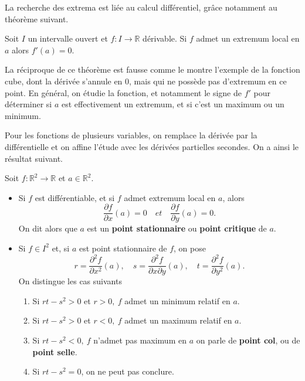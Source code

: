 		
		La recherche des extrema est liée au calcul différentiel, grâce notamment au théorème suivant.
		\begin{theorem}
			
			Soit $I$  un intervalle ouvert et $f:  I\rightarrow \mathbb{R} $ dérivable. Si $f$ admet un extremum local en $a$ alors $f'(a) = 0$.
		\end{theorem}
		La réciproque de ce théorème est fausse comme le montre l'exemple de la fonction cube, dont la dérivée s'annule en $0$, mais qui ne possède pas d'extremum en ce point. En général, on étudie la fonction, et notamment le signe de $f'$ pour déterminer si $a$ est effectivement un extremum, et si c'est un maximum ou un minimum.
				
		Pour les fonctions de plusieurs variables, on remplace la dérivée par la différentielle et on affine l'étude avec les dérivées partielles secondes. On a ainsi le résultat suivant.
		
		\begin{theorem}
			
			Soit $f: \mathbb{R}^2\rightarrow \mathbb{R} $  et $a \in \mathbb{R}^2 $.
			\begin{itemize}
				\item Si $f$ est différentiable, et si $f$ admet extremum local en $a$, alors 
				$$
				\frac{\partial f}{\partial x}(a)=0 \quad et \quad \frac{\partial f}{\partial y}(a)=0.
				$$
				On dit alors que $a$ est un \textbf{point stationnaire} ou \textbf{point critique} de $a$.
				\item Si $f \in I^2$ et, si  $a$ est point stationnaire de $f$, on pose
				$$ 
				r = \frac{\partial^2 f}{\partial x^2 }(a), \quad
				s = \frac{\partial^2 f}{\partial x \partial y }(a), \quad
				t = \frac{\partial^2 f}{\partial y^2 }(a).
				$$
				On distingue les cas suivants
				\begin{enumerate}
					\item Si $rt-s^2 > 0$ et $r > 0,\ f$ admet un minimum relatif en $a$.
					\item Si $rt-s^2 > 0$ et $r < 0,\ f$ admet un maximum relatif en $a$.
					\item Si $rt-s^2 < 0,\ f$ n'admet pas maximum en $a$ on parle de \textbf{point col}, ou de \textbf{point selle}.
					\item Si $rt-s^2 = 0$, on ne peut pas conclure.	
				\end{enumerate} 
			\end{itemize}
		\end{theorem}
		
